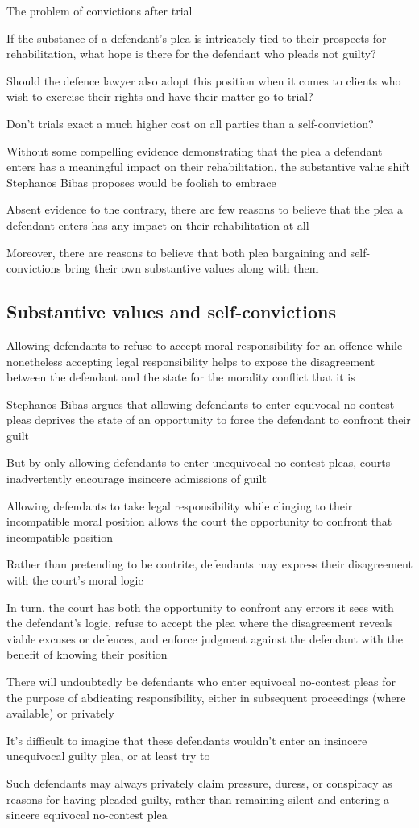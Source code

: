 The problem of convictions after trial

If the substance of a defendant's plea is intricately tied to their prospects for rehabilitation, what hope is there for the defendant who pleads not guilty?

Should the defence lawyer also adopt this position when it comes to clients who wish to exercise their rights and have their matter go to trial?

Don't trials exact a much higher cost on all parties than a self-conviction?

Without some compelling evidence demonstrating that the plea a defendant enters has a meaningful impact on their rehabilitation, the substantive value shift Stephanos Bibas proposes would be foolish to embrace

Absent evidence to the contrary, there are few reasons to believe that the plea a defendant enters has any impact on their rehabilitation at all

Moreover, there are reasons to believe that both plea bargaining and self-convictions bring their own substantive values along with them

\subsection{Substantive values and self-convictions}

Allowing defendants to refuse to accept moral responsibility for an offence while nonetheless accepting legal responsibility helps to expose the disagreement between the defendant and the state for the morality conflict that it is

Stephanos Bibas argues that allowing defendants to enter equivocal no-contest pleas deprives the state of an opportunity to force the defendant to confront their guilt

But by only allowing defendants to enter unequivocal no-contest pleas, courts inadvertently encourage insincere admissions of guilt

Allowing defendants to take legal responsibility while clinging to their incompatible moral position allows the court the opportunity to confront that incompatible position

Rather than pretending to be contrite, defendants may express their disagreement with the court's moral logic

In turn, the court has both the opportunity to confront any errors it sees with the defendant's logic, refuse to accept the plea where the disagreement reveals viable excuses or defences, and enforce judgment against the defendant with the benefit of knowing their position

There will undoubtedly be defendants who enter equivocal no-contest pleas for the purpose of abdicating responsibility, either in subsequent proceedings (where available) or privately

It's difficult to imagine that these defendants wouldn't enter an insincere unequivocal guilty plea, or at least try to

Such defendants may always privately claim pressure, duress, or conspiracy as reasons for having pleaded guilty, rather than remaining silent and entering a sincere equivocal no-contest plea